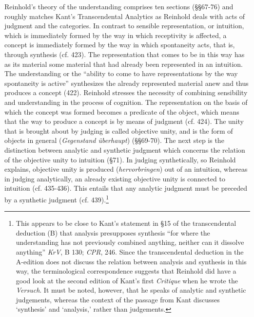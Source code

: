 Reinhold's theory of the understanding comprises ten sections (\S \S  67{-}76) and roughly matches Kant's Transcendental Analytics as Reinhold deals with acts of judgment and the categories. In contrast to sensible representation, or intuition, which is immediately formed by the way in which receptivity is affected, a concept is immediately formed by the way in which spontaneity acts, that is, through synthesis (cf. 423). The representation that comes to be in this way has as its material some material that had already been represented in an intuition. The understanding or the ``ability to come to have representations by the way spontaneity is active'' synthesizes the already represented material anew and thus produces a concept (422). Reinhold stresses the necessity of combining sensibility and understanding in the process of cognition. The representation on the basis of which the concept was formed becomes a predicate of the object, which means that the way to produce a concept is by means of judgment (cf. 424). The unity that is brought about by judging is called objective unity, and is the form of objects in general (\textit{Gegenstand \"{u}berhaupt}) (\S \S  69{-}70). The next step is the distinction between analytic and synthetic judgment which concerns the relation of the objective unity to intuition (\S  71). In judging synthetically, so Reinhold explains, objective unity is produced (\textit{hervorbringen}) out of an intuition, whereas in judging analytically, an already existing objective unity is connected to intuition (cf. 435{-}436). This entails that any analytic judgment must be preceded by a synthetic judgment (cf. 439).\footnote{ This appears to be close to Kant's statement in \S  15 of the transcendental deduction (B) that analysis presupposes synthesis ``for where the understanding has not previously combined anything, neither can it dissolve anything'' \textit{KrV}, B 130; \textit{CPR}, 246. Since the transcendental deduction in the A{-}edition does not discuss the relation between analysis and synthesis in this way, the terminological correspondence suggests that Reinhold did have a good look at the second edition of Kant's first \textit{Critique} when he wrote the \textit{Versuch}. It must be noted, however, that he speaks of analytic and synthetic judgements, whereas the context of the passage from Kant discusses `synthesis' and `analysis,' rather than judgements. } 

